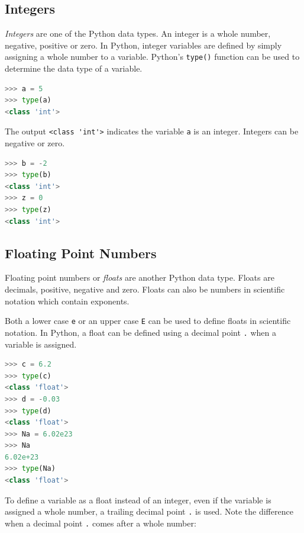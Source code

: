 \documentclass{book}
\begin{document}
    
        \subsection{Integers}\label{integers}

\emph{Integers} are one of the Python data types. An integer is a whole
number, negative, positive or zero. In Python, integer variables are
defined by simply assigning a whole number to a variable. Python's
\lstinline!type()! function can be used to determine the data type of a
variable.

\begin{lstlisting}[language=Python]
>>> a = 5
>>> type(a)
<class 'int'>
\end{lstlisting}

The output \lstinline!<class 'int'>! indicates the variable
\lstinline!a! is an integer. Integers can be negative or zero.

\begin{lstlisting}[language=Python]
>>> b = -2
>>> type(b)
<class 'int'>
>>> z = 0
>>> type(z)
<class 'int'>
\end{lstlisting}
    




    
        \subsection{Floating Point Numbers}\label{floating-point-numbers}

Floating point numbers or \emph{floats} are another Python data type.
Floats are decimals, positive, negative and zero. Floats can also be
numbers in scientific notation which contain exponents.

Both a lower case \lstinline!e! or an upper case \lstinline!E! can be
used to define floats in scientific notation. In Python, a float can be
defined using a decimal point \lstinline!.! when a variable is assigned.

\begin{lstlisting}[language=Python]
>>> c = 6.2
>>> type(c)
<class 'float'>
>>> d = -0.03
>>> type(d)
<class 'float'>
>>> Na = 6.02e23
>>> Na
6.02e+23
>>> type(Na)
<class 'float'>
\end{lstlisting}

To define a variable as a float instead of an integer, even if the
variable is assigned a whole number, a trailing decimal point
\lstinline!.! is used. Note the difference when a decimal point
\lstinline!.! comes after a whole number:
\end{document}
